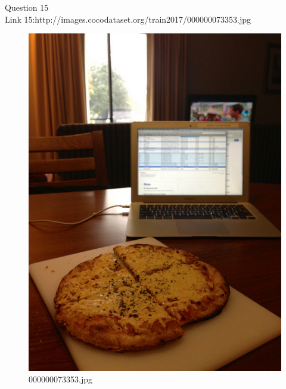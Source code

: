Question 15\\
Link 15:http://images.cocodataset.org/train2017/000000073353.jpg
    \begin{figure}[h]
        \centering
        \includegraphics[width=0.8\linewidth]{../image set/easy/000000073353.jpg}
        \caption{000000073353.jpg}
    \end{figure}
